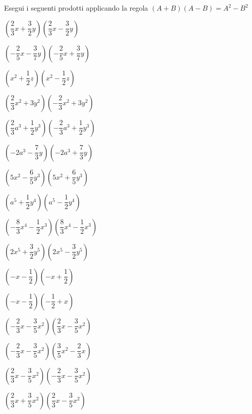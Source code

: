 \begin{esercizio}
 \label{ese:11.17}
Esegui i seguenti prodotti applicando la regola
$\left(A+B\right)\left(A-B\right)=A^{2}-B^{2}$
 \begin{multicols}{2}
\begin{enumeratea}
 \item $\left(\dfrac{2}{3}x+\dfrac{3}{2}y\right)
        \left(\dfrac{2}{3}x-\dfrac{3}{2}y\right)$
 \item $\left(-{\dfrac{2}{5}}x-\dfrac{3}{7}y\right)
        \left(-{\dfrac{2}{5}}x+\dfrac{3}{7}y\right)$
 \item $\left(x^{2}+\dfrac{1}{2}z\right)
        \left(x^{2}-\dfrac{1}{2}z\right)$
 \item $\left(\dfrac{2}{3}x^{2}+3y^{2}\right)
        \left(-{\dfrac{2}{3}}x^{2}+3y^{2}\right)$
 \item $\left(\dfrac{2}{3}a^{3}+\dfrac{1}{2}y^{3}\right)
        \left(-{\dfrac{2}{3}}a^{3}+\dfrac{1}{2}y^{3}\right)$
 \item $\left(-2a^{3}-\dfrac{7}{3}y\right)\left(-2a^{3}+\dfrac{7}{3}y\right)$
 \item $\left(5x^{2}-\dfrac{6}{5}y^{3}\right)
        \left(5x^{2}+\dfrac{6}{5}y^{3}\right)$
 \item $\left(a^{5}+\dfrac{1}{2}y^{4}\right)
        \left(a^{5}-\dfrac{1}{2}y^{4}\right)$
 \item $\left(-{\dfrac{8}{3}}x^{4}-\dfrac{1}{2}x^{3}\right)
        \left(\dfrac{8}{3}x^{4}-\dfrac{1}{2}x^{3}\right)$
 \item $\left(2x^{5}+\dfrac{3}{2}y^{5}\right)
        \left(2x^{5}-\dfrac{3}{2}y^{5}\right)$
 \item $\left(-x-\dfrac{1}{2}\right)\left(-x+\dfrac{1}{2}\right)$
 \item $\left(-x-\dfrac{1}{2}\right)\left(-{\dfrac{1}{2}}+x\right)$
 \item $\left(-{\dfrac{2}{3}x-\dfrac{3}{5}x^{2}}\right)
        \left(\dfrac{2}{3}x-\dfrac{3}{5}x^{2}\right)$
 \item $\left(-{\dfrac{2}{3}x-\dfrac{3}{5}x^{2}}\right)
        \left(\dfrac{3}{5}x^{2}-\dfrac{2}{3}x\right)$
 \item $\left(\dfrac{2}{3}x-\dfrac{3}{5}x^{2}\right)
        \left(-{\dfrac{2}{3}x-\dfrac{3}{5}x^{2}}\right)$
 \item $\left(\dfrac{2}{3}x+\dfrac{3}{5}x^{2}\right)
        \left(\dfrac{2}{3}x-\dfrac{3}{5}x^{2}\right)$
\end{enumeratea}
\end{multicols}
\end{esercizio}

